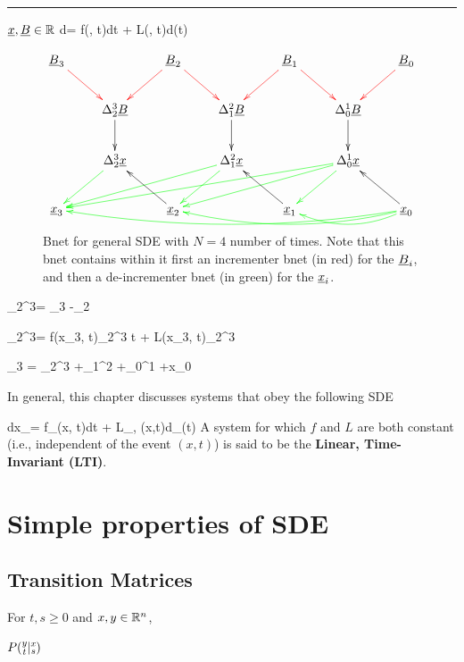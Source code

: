 \hrule {}

${\underline{x}}, {\underline{B}}\in { \mathbb{R}}$
\beq
d\rvx= f(\rvx, t)dt + L(\rvx, t)d\rvB(t)
\eeq

\begin{figure}
$$
\xymatrix{
\rvB_3\ar@[red][dr] 
&& \rvB_2\ar@[red][dl]\ar@[red][dr]
&& \rvB_1\ar@[red][dl]\ar@[red][dr]
&& \rvB_0\ar@[red][dl]
\\
&\Delta^3_2\rvB \ar[d]
&&\Delta^2_1 \rvB \ar[d]
&&\Delta^1_0 \rvB \ar[d]
&
\\
&\Delta^3_2\rvx \ar@[green][dl] 
&&\Delta^2_1 \rvx \ar@[green][dlll]\ar@[green][dl]
&&\Delta^1_0\rvx \ar@[green][dlllll]\ar@[green][dlll]\ar@[green][dl]
&
\\
\rvx_3 
&& \rvx_2 \ar[lu] 
&& \rvx_1 \ar[lu]
&& \rvx_0\ar[lu]
\ar@[green]@[green]@/^1pc/[ll]
\ar@[green]@/^1pc/[llll]
\ar@[green]@/^1pc/[llllll]
}
$$
\caption{Bnet for general SDE with $N=4$ number of times. Note that this bnet
contains within it first an incrementer bnet
(in red) for the ${\underline{B}}_i$,
and
then a de-incrementer bnet (in green)
for the ${\underline{x}}_i$.}
\label{fig-sde-3-nodes}
\end{figure}


\beq
\color{blue}
\Delta_{2}^{3}\rvB = 
\rvB_3 -\rvB_2
\eeq

\beq
\color{blue}
\Delta_{2}^{3}\rvx = 
f(x_3, t)\Delta_2^3 t +
L(x_3, t)\Delta_{2}^{3}\rvB
\eeq

\beq\color{blue}
\rvx_3 = \Delta_{2}^{3}\rvx
+\Delta_{1}^{2}\rvx
+\Delta_{0}^{1}\rvx
+x_0
\eeq

In general, this chapter discusses
systems that obey the following SDE 

\beq
dx_\mu =
f_\mu(x, t)dt + L_{\mu, \nu}(x,t)d\rvB_\nu(t)
\eeq
A system for which $f$ and $L$ are
both constant (i.e., independent of the event $(x,t)$) is said to be the {\bf Linear, Time-Invariant (LTI)}.




\section{Simple properties of SDE}

\subsection {Transition Matrices}

For $t,s\geq 0$ and $x, y\in { \mathbb{R}}^n$,

$P(\substack{y\\t}|\substack{x\\s})$

